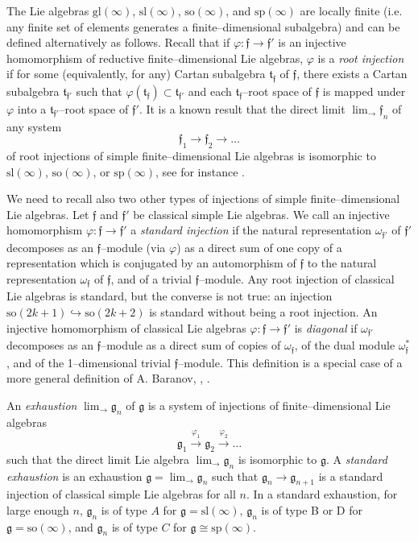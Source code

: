 \documentclass[oneside,leqno,12pt]{article}
\def\gf{\mathfrak{f}}
\def\gg{\mathfrak{g}}
\def\gt{\mathfrak{t}}
\renewcommand{\gg}{\mathfrak{g}}
\renewcommand {\phi} {\varphi}
\renewcommand{\sp}{\mathrm{sp}}
\newcommand{\gl}{\mathrm{gl}}
\renewcommand{\sl}{\mathrm{sl}}
\newcommand{\so}{\mathrm{so}}
\begin{document}
The Lie algebras $\gl(\infty)$, $\sl(\infty)$, $\so(\infty)$, and $\sp(\infty)$ are locally finite (i.e. any finite set of elements generates a finite--dimensional subalgebra) and can be defined alternatively as follows. Recall that if $\phi:\gf\to \gf'$ is an injective homomorphism of reductive finite--dimensional Lie algebras, $\phi$ is a \emph{root injection} if for some (equivalently, for any) Cartan subalgebra $\gt_\gf$ of $\gf$, there exists a Cartan subalgebra $\gt_{\gf'}$ such that $\phi(\gt_{\gf})\subset \gt_{\gf'}$ and each $\gt_{\gf}$--root space of $\gf$ is mapped under $\phi$ into a $\gt_{\gf'}$--root space of $\gf'$. It is a known result that the direct limit $\displaystyle\lim_\to \gf_n$ of any system
\[
\gf_1\to\gf_2\to\dots
\] 
of root injections of simple finite--dimensional Lie algebras is isomorphic to $\sl(\infty)$, $\so(\infty)$, or $\sp(\infty)$, see for instance \cite{DP1}.

We need to recall also two other types of injections of simple finite--dimensional Lie algebras. Let $\gf$ and $\gf'$ be classical simple Lie algebras. We call an injective homomorphism $\phi:\gf\to\gf'$ a \emph{standard injection} if the natural representation $\omega_{\gf'}$ of $\gf'$ 
decomposes as an $\gf$--module (via $\phi$) as a direct sum of one copy of a representation which is conjugated by an automorphism of $\gf$ to the natural representation $\omega_\gf$ of $\gf$, and of a trivial $\gf$--module. Any root injection of classical Lie algebras is standard, but the converse is not true: an injection $\so(2k+1)\hookrightarrow\so(2k+2)$ is standard without being a root injection. An injective homomorphism of classical Lie algebras $\phi:\gf\to\gf'$ is \emph{diagonal}  if $\omega_{\gf'}$ decomposes as an $\gf$--module as a direct sum of copies of $\omega_\gf$, of the dual module $\omega_\gf^*$, and of the 1--dimensional trivial $\gf$--module. 
This definition is a special case of a more general definition of A. Baranov, \cite{Ba2}, \cite{BZh}.



An \emph{exhaustion} $\displaystyle\lim_\to \gg_n$ of $\gg$  is a system of injections of 
finite--dimensional Lie algebras
\[
\gg_1\stackrel{\phi_1}{\to}\gg_2\stackrel{\phi_2}{\to}\dots
\] 
such that the direct limit Lie algebra $\displaystyle\lim_\to\gg_n$ is isomorphic to $\gg$. A \emph{standard exhaustion} is an exhaustion $\displaystyle\gg=\lim_\to\gg_n$ such that $\gg_n\to\gg_{n+1}$ is a standard injection of classical simple Lie algebras for all $n$. In a standard exhaustion, for large enough $n$, $\gg_n$ is of type $A$ for $\gg=\sl(\infty)$, $\gg_n$ is of type B or D for $\gg=\so(\infty)$, and $\gg_n$ is of type $C$ for $\gg\cong\sp(\infty)$. 
\end{document}
